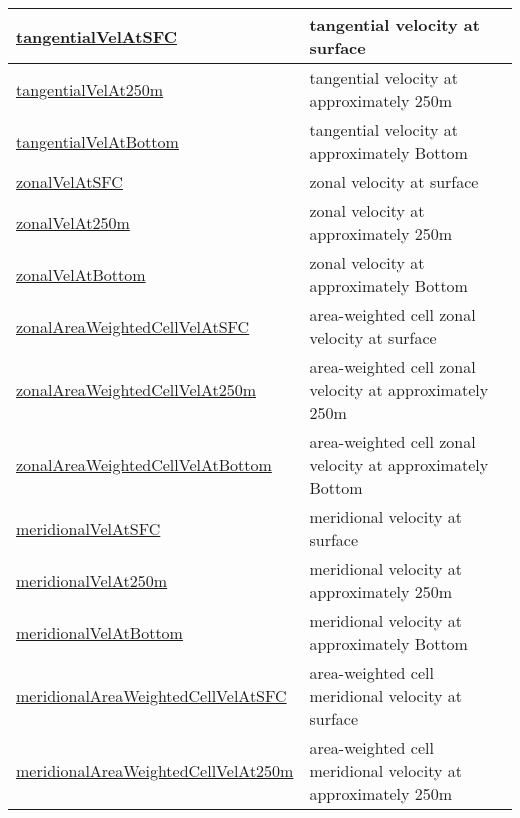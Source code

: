 {\begin{center}
\begin{longtable}{| p{2.0in} | p{4.0in} |}
    \hline
    \hyperref[subsec:var_sec_highFrequencyOutputAM_tangentialVelAtSFC]{tangentialVelAtSFC} & tangential velocity at surface \\
    \hline
    \hyperref[subsec:var_sec_highFrequencyOutputAM_tangentialVelAt250m]{tangentialVelAt250m} & tangential velocity at approximately 250m \\
    \hline
    \hyperref[subsec:var_sec_highFrequencyOutputAM_tangentialVelAtBottom]{tangentialVelAtBottom} & tangential velocity at approximately Bottom \\
    \hline
    \hyperref[subsec:var_sec_highFrequencyOutputAM_zonalVelAtSFC]{zonalVelAtSFC} & zonal velocity at surface \\
    \hline
    \hyperref[subsec:var_sec_highFrequencyOutputAM_zonalVelAt250m]{zonalVelAt250m} & zonal velocity at approximately 250m \\
    \hline
    \hyperref[subsec:var_sec_highFrequencyOutputAM_zonalVelAtBottom]{zonalVelAtBottom} & zonal velocity at approximately Bottom \\
    \hline
    \hyperref[subsec:var_sec_highFrequencyOutputAM_zonalAreaWeightedCellVelAtSFC]{zonalAreaWeightedCellVelAtSFC} & area-weighted cell zonal velocity at surface \\
    \hline
    \hyperref[subsec:var_sec_highFrequencyOutputAM_zonalAreaWeightedCellVelAt250m]{zonalAreaWeightedCellVel\-At250m} & area-weighted cell zonal velocity at approximately 250m \\
    \hline
    \hyperref[subsec:var_sec_highFrequencyOutputAM_zonalAreaWeightedCellVelAtBottom]{zonalAreaWeightedCellVelAt\-Bottom} & area-weighted cell zonal velocity at approximately Bottom \\
    \hline
    \hyperref[subsec:var_sec_highFrequencyOutputAM_meridionalVelAtSFC]{meridionalVelAtSFC} & meridional velocity at surface \\
    \hline
    \hyperref[subsec:var_sec_highFrequencyOutputAM_meridionalVelAt250m]{meridionalVelAt250m} & meridional velocity at approximately 250m \\
    \hline
    \hyperref[subsec:var_sec_highFrequencyOutputAM_meridionalVelAtBottom]{meridionalVelAtBottom} & meridional velocity at approximately Bottom \\
    \hline
    \hyperref[subsec:var_sec_highFrequencyOutputAM_meridionalAreaWeightedCellVelAtSFC]{meridionalAreaWeightedCellVel\-AtSFC} & area-weighted cell meridional velocity at surface \\
    \hline
    \hyperref[subsec:var_sec_highFrequencyOutputAM_meridionalAreaWeightedCellVelAt250m]{meridionalAreaWeightedCellVel\-At250m} & area-weighted cell meridional velocity at approximately 250m \\

\end{longtable}
\end{center}}
